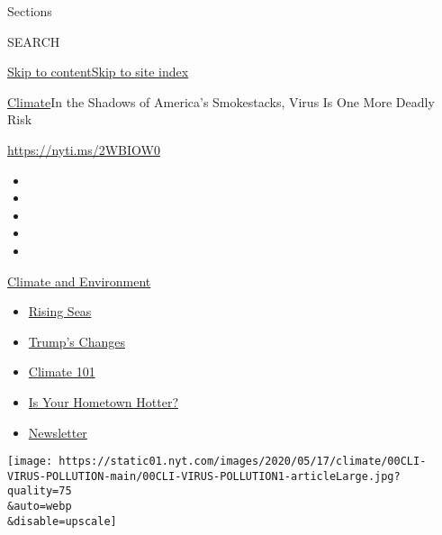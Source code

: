 Sections

SEARCH

\protect\hyperlink{site-content}{Skip to
content}\protect\hyperlink{site-index}{Skip to site index}

\href{/section/climate}{Climate}\textbar{}In the Shadows of America's
Smokestacks, Virus Is One More Deadly Risk

\url{https://nyti.ms/2WBIOW0}

\begin{itemize}
\item
\item
\item
\item
\item
\end{itemize}

\href{https://www.nytimes.com/section/climate?action=click\&pgtype=Article\&state=default\&region=TOP_BANNER\&context=storylines_menu}{Climate
and Environment}

\begin{itemize}
\tightlist
\item
  \href{https://www.nytimes.com/2020/07/30/climate/sea-level-inland-floods.html?action=click\&pgtype=Article\&state=default\&region=TOP_BANNER\&context=storylines_menu}{Rising
  Seas}
\item
  \href{https://www.nytimes.com/interactive/2020/climate/trump-environment-rollbacks.html?action=click\&pgtype=Article\&state=default\&region=TOP_BANNER\&context=storylines_menu}{Trump's
  Changes}
\item
  \href{https://www.nytimes.com/interactive/2020/04/19/climate/climate-crash-course-1.html?action=click\&pgtype=Article\&state=default\&region=TOP_BANNER\&context=storylines_menu}{Climate
  101}
\item
  \href{https://www.nytimes.com/interactive/2018/08/30/climate/how-much-hotter-is-your-hometown.html?action=click\&pgtype=Article\&state=default\&region=TOP_BANNER\&context=storylines_menu}{Is
  Your Hometown Hotter?}
\item
  \href{https://www.nytimes.com/newsletters/climate-change?action=click\&pgtype=Article\&state=default\&region=TOP_BANNER\&context=storylines_menu}{Newsletter}
\end{itemize}

\texttt{[image: https://static01.nyt.com/images/2020/05/17/climate/00CLI-VIRUS-POLLUTION-main/00CLI-VIRUS-POLLUTION1-articleLarge.jpg?quality=75\\\&auto=webp\\\&disable=upscale]}

